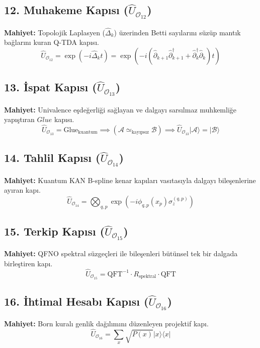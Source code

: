 \documentclass[11pt, a4paper]{article}
\begin{document}
\subsection{12. Muhakeme Kapısı ($\hat{U}_{\mathcal{O}_{12}}$)}
\textbf{Mahiyet:} Topolojik Laplasyen ($\hat{\Delta}_k$) üzerinden Betti sayılarını süzüp mantık bağlarını kuran Q-TDA kapısı.
\begin{equation}
\hat{U}_{\mathcal{O}_{12}} = \exp\left( -i \hat{\Delta}_k t \right) = \exp\left( -i (\hat{\partial}_{k+1} \hat{\partial}_{k+1}^\dagger + \hat{\partial}_k^\dagger \hat{\partial}_k) t \right)
\end{equation}

\subsection{13. İspat Kapısı ($\hat{U}_{\mathcal{O}_{13}}$)}
\textbf{Mahiyet:} Univalence eşdeğerliği sağlayan ve dalgayı sarsılmaz muhkemliğe yapıştıran $Glue$ kapısı.
\begin{equation}
\hat{U}_{\mathcal{O}_{13}} = \text{Glue}_{\text{kuantum}} \implies (\mathcal{A} \simeq_{\text{kayıpsız}} \mathcal{B}) \implies \hat{U}_{\mathcal{O}_{13}} |\mathcal{A}\rangle = |\mathcal{B}\rangle
\end{equation}

\subsection{14. Tahlil Kapısı ($\hat{U}_{\mathcal{O}_{14}}$)}
\textbf{Mahiyet:} Kuantum KAN B-spline kenar kapıları vasıtasıyla dalgayı bileşenlerine ayıran kapı.
\begin{equation}
\hat{U}_{\mathcal{O}_{14}} = \bigotimes_{q,p} \exp\left( -i \phi_{q,p}(x_p) \sigma_z^{(q,p)} \right)
\end{equation}

\subsection{15. Terkip Kapısı ($\hat{U}_{\mathcal{O}_{15}}$)}
\textbf{Mahiyet:} QFNO spektral süzgeçleri ile bileşenleri bütünsel tek bir dalgada birleştiren kapı.
\begin{equation}
\hat{U}_{\mathcal{O}_{15}} = \text{QFT}^{-1} \cdot R_{\text{spektral}} \cdot \text{QFT}
\end{equation}

\subsection{16. İhtimal Hesabı Kapısı ($\hat{U}_{\mathcal{O}_{16}}$)}
\textbf{Mahiyet:} Born kuralı genlik dağılımını düzenleyen projektif kapı.
\begin{equation}
\hat{U}_{\mathcal{O}_{16}} = \sum_x \sqrt{P(x)} |x\rangle \langle x|
\end{equation}
\end{document}
